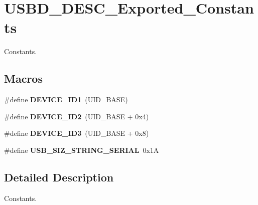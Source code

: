 \hypertarget{group__USBD__DESC__Exported__Constants}{}\section{U\+S\+B\+D\+\_\+\+D\+E\+S\+C\+\_\+\+Exported\+\_\+\+Constants}
\label{group__USBD__DESC__Exported__Constants}


Constants.  


\subsection*{Macros}
\begin{DoxyCompactItemize}
\item 
\mbox{\label{group__USBD__DESC__Exported__Constants_gacba0623797117dcaf178232d734c9c24}} 
\#define {\bfseries D\+E\+V\+I\+C\+E\+\_\+\+I\+D1}~(U\+I\+D\+\_\+\+B\+A\+SE)
\item 
\mbox{\label{group__USBD__DESC__Exported__Constants_gacb8818cd7029deb2affd8a8a482bc86a}} 
\#define {\bfseries D\+E\+V\+I\+C\+E\+\_\+\+I\+D2}~(U\+I\+D\+\_\+\+B\+A\+SE + 0x4)
\item 
\mbox{\label{group__USBD__DESC__Exported__Constants_ga2b63a0afba377e3cf5a76f78abb2a970}} 
\#define {\bfseries D\+E\+V\+I\+C\+E\+\_\+\+I\+D3}~(U\+I\+D\+\_\+\+B\+A\+SE + 0x8)
\item 
\mbox{\label{group__USBD__DESC__Exported__Constants_ga76287dc6e5f3cf4566406bd9b2eb7a2f}} 
\#define {\bfseries U\+S\+B\+\_\+\+S\+I\+Z\+\_\+\+S\+T\+R\+I\+N\+G\+\_\+\+S\+E\+R\+I\+AL}~0x1A
\end{DoxyCompactItemize}


\subsection{Detailed Description}
Constants. 

